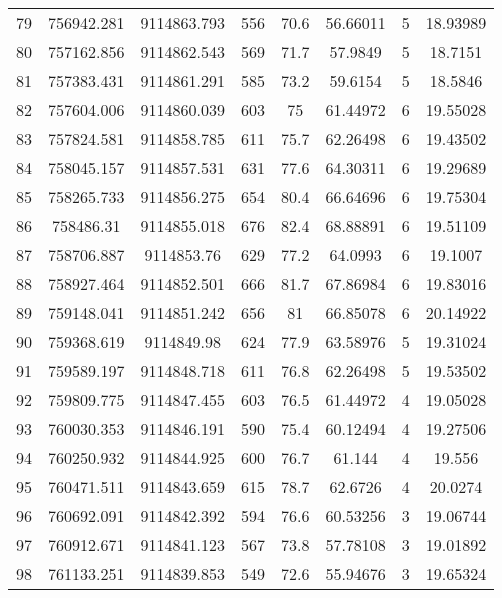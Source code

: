 \begin{longtable}{cccccccc}
79   & 756942.281      & 9114863.793      & 556     & 70.6  & 56.66011 & 5  & 18.93989 \\
80   & 757162.856      & 9114862.543      & 569     & 71.7  & 57.9849  & 5  & 18.7151  \\
81   & 757383.431      & 9114861.291      & 585     & 73.2  & 59.6154  & 5  & 18.5846  \\
82   & 757604.006      & 9114860.039      & 603     & 75    & 61.44972 & 6  & 19.55028 \\
83   & 757824.581      & 9114858.785      & 611     & 75.7  & 62.26498 & 6  & 19.43502 \\
84   & 758045.157      & 9114857.531      & 631     & 77.6  & 64.30311 & 6  & 19.29689 \\
85   & 758265.733      & 9114856.275      & 654     & 80.4  & 66.64696 & 6  & 19.75304 \\
86   & 758486.31       & 9114855.018      & 676     & 82.4  & 68.88891 & 6  & 19.51109 \\
87   & 758706.887      & 9114853.76       & 629     & 77.2  & 64.0993  & 6  & 19.1007  \\
88   & 758927.464      & 9114852.501      & 666     & 81.7  & 67.86984 & 6  & 19.83016 \\
89   & 759148.041      & 9114851.242      & 656     & 81    & 66.85078 & 6  & 20.14922 \\
90   & 759368.619      & 9114849.98       & 624     & 77.9  & 63.58976 & 5  & 19.31024 \\
91   & 759589.197      & 9114848.718      & 611     & 76.8  & 62.26498 & 5  & 19.53502 \\
92   & 759809.775      & 9114847.455      & 603     & 76.5  & 61.44972 & 4  & 19.05028 \\
93   & 760030.353      & 9114846.191      & 590     & 75.4  & 60.12494 & 4  & 19.27506 \\
94   & 760250.932      & 9114844.925      & 600     & 76.7  & 61.144   & 4  & 19.556   \\
95   & 760471.511      & 9114843.659      & 615     & 78.7  & 62.6726  & 4  & 20.0274  \\
96   & 760692.091      & 9114842.392      & 594     & 76.6  & 60.53256 & 3  & 19.06744 \\
97   & 760912.671      & 9114841.123      & 567     & 73.8  & 57.78108 & 3  & 19.01892 \\
98   & 761133.251      & 9114839.853      & 549     & 72.6  & 55.94676 & 3  & 19.65324 \\

\end{longtable}
